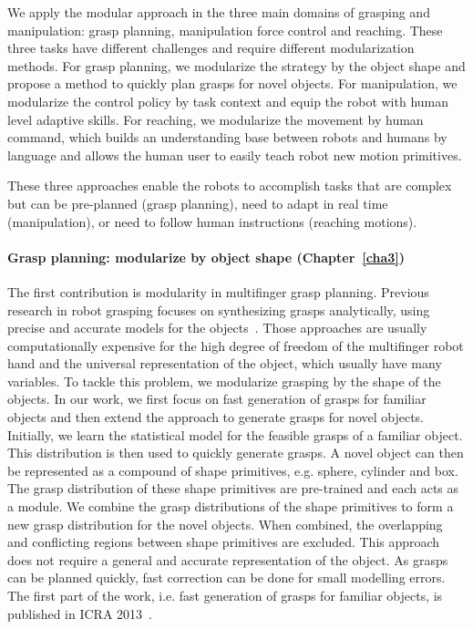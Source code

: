 We apply the modular approach in the three main domains of grasping and manipulation: grasp planning, manipulation force control and reaching. These three tasks have different challenges and require different modularization methods. For grasp planning, we modularize the strategy by the object shape and propose a method to quickly plan grasps for novel objects. For manipulation, we modularize the control policy by task context and equip the robot with human level adaptive skills. For reaching, we modularize the movement by human command, which builds an understanding base between robots and humans by language and allows the human user to easily teach robot new motion primitives.

These three approaches enable the robots to accomplish tasks that are complex but can be pre-planned (grasp planning), need to adapt in real time (manipulation), or need to follow human instructions (reaching motions).



\paragraph{Grasp planning: modularize by object shape (Chapter~\ref{cha3})}
The first contribution is modularity in multifinger grasp planning. Previous research in robot grasping focuses on synthesizing grasps analytically, using precise and accurate models for the objects~\citep{sahbani2011overview}. Those approaches are usually computationally expensive for the high degree of freedom of the multifinger robot hand and the universal representation of the object, which usually have many variables. To tackle this problem, we modularize grasping by the shape of the objects. In our work, we first focus on fast generation of grasps for familiar objects and then extend the approach to generate grasps for novel objects.
Initially, we learn the statistical model for the feasible grasps of a familiar object. This distribution is then used to quickly generate grasps. A novel object can then be represented as a compound of shape primitives, e.g. sphere, cylinder and box. The grasp distribution of these shape primitives are pre-trained and each acts as a module. We combine the grasp distributions of the shape primitives to form a new grasp distribution for the novel objects. When combined, the overlapping and conflicting regions between shape primitives are excluded.
This approach does not require a general and accurate representation of the object. As grasps can be planned quickly, fast correction can be done for small modelling errors. The first part of the work, i.e. fast generation of grasps for familiar objects, is published in ICRA 2013~\citep{bidan2013grasp}.

